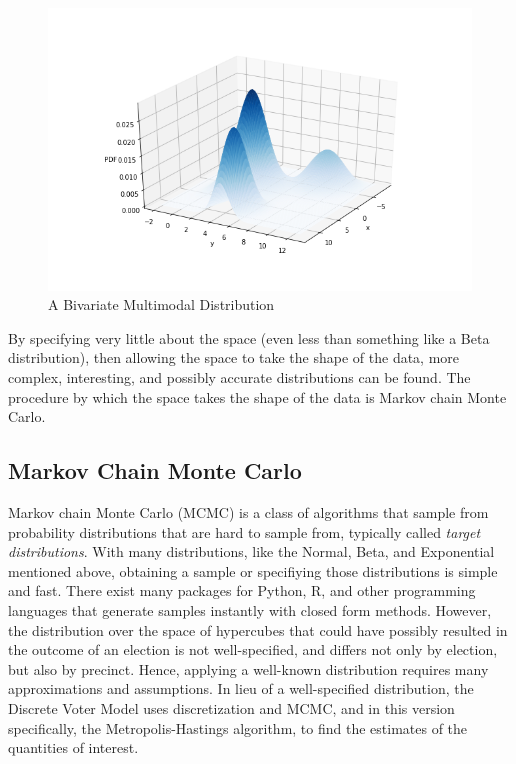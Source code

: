 \documentclass[fleqn,10pt]{style}
\begin{document}
\begin{figure}[ht]\centering
 \includegraphics[width=\linewidth]{images/multimodal_example.png}
 \caption{A Bivariate Multimodal Distribution}
 \label{fig:multimodal_example}
\end{figure}

By specifying very little about the space (even less than something like a Beta distribution), then allowing the space to take the shape of the data, more complex, interesting, and possibly accurate distributions can be found. The procedure by which the space takes the shape of the data is Markov chain Monte Carlo.

\subsection{Markov Chain Monte Carlo}

Markov chain Monte Carlo (MCMC) is a class of algorithms that sample from probability distributions that are hard to sample from, typically called \emph{target distributions}.\cite{mcmc_history} With many distributions, like the Normal, Beta, and Exponential mentioned above, obtaining a sample or specifiying those distributions is simple and fast. There exist many packages for Python, R, and other programming languages that generate samples instantly with closed form methods. However, the distribution over the space of hypercubes that could have possibly resulted in the outcome of an election is not well-specified, and differs not only by election, but also by precinct. Hence, applying a well-known distribution requires many approximations and assumptions. In lieu of a well-specified distribution, the Discrete Voter Model uses discretization and MCMC, and in this version specifically, the Metropolis-Hastings algorithm, to find the estimates of the quantities of interest.
\end{document}
